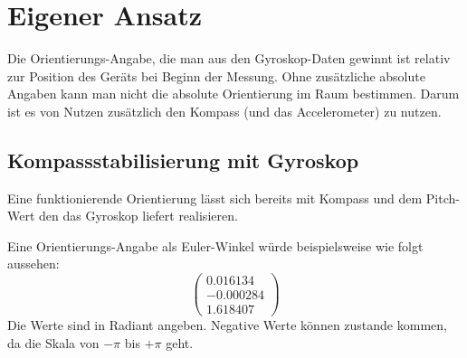 
\chapter{Eigener Ansatz}
  \label{Ansatz}
  
Die Orientierungs-Angabe, die man aus den Gyroskop-Daten gewinnt ist relativ zur Position des Geräts bei Beginn der Messung. Ohne zusätzliche absolute Angaben kann man nicht die absolute Orientierung im Raum bestimmen. Darum ist es von Nutzen zusätzlich den Kompass (und das Accelerometer) zu nutzen.
  
\section{Kompassstabilisierung mit Gyroskop}
Eine funktionierende Orientierung lässt sich bereits mit Kompass und dem Pitch-Wert den das Gyroskop liefert realisieren. 
















Eine Orientierungs-Angabe als Euler-Winkel würde beispielsweise wie folgt aussehen: 
$$
\begin{pmatrix}
    0.016134\\ 
    -0.000284\\ 
    1.618407
  \end{pmatrix} 
$$
Die Werte sind in Radiant angeben. Negative Werte können zustande kommen, da die Skala von $-\pi$ bis $+\pi$ geht.




